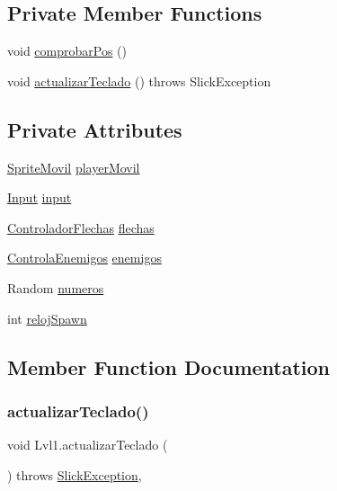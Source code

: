 \subsection*{Private Member Functions}
\begin{DoxyCompactItemize}
\item 
void \mbox{\hyperlink{class_lvl1_a78b06f34feedd942b1af193cedb0ed1e}{comprobar\+Pos}} ()
\item 
void \mbox{\hyperlink{class_lvl1_aa60cbf1fa3189b5e57d8c0171c4d634c}{actualizar\+Teclado}} ()  throws Slick\+Exception
\end{DoxyCompactItemize}
\subsection*{Private Attributes}
\begin{DoxyCompactItemize}
\item 
\mbox{\hyperlink{class_sprite_movil}{Sprite\+Movil}} \mbox{\hyperlink{class_lvl1_a7ac9bfa1d79eb27089228a152072efd2}{player\+Movil}}
\item 
\mbox{\hyperlink{classorg_1_1newdawn_1_1slick_1_1_input}{Input}} \mbox{\hyperlink{class_lvl1_abd0692137420767ebe0bb0b3d5b2cfd8}{input}}
\item 
\mbox{\hyperlink{class_controlador_flechas}{Controlador\+Flechas}} \mbox{\hyperlink{class_lvl1_a252ada5a964b9a5b559aaa0773cb5643}{flechas}}
\item 
\mbox{\hyperlink{class_controla_enemigos}{Controla\+Enemigos}} \mbox{\hyperlink{class_lvl1_af3ba4e431a1c46ce7ee27eaf566c5978}{enemigos}}
\item 
Random \mbox{\hyperlink{class_lvl1_ad5839902bce539ea6f65fd915b1c5e8a}{numeros}}
\item 
int \mbox{\hyperlink{class_lvl1_a414b04482f33deead358ca7f1b5c6de0}{reloj\+Spawn}}
\end{DoxyCompactItemize}


\subsection{Member Function Documentation}
\mbox{\label{class_lvl1_aa60cbf1fa3189b5e57d8c0171c4d634c}} 
\subsubsection{\texorpdfstring{actualizar\+Teclado()}{actualizarTeclado()}}
{\footnotesize\ttfamily void Lvl1.\+actualizar\+Teclado (\begin{DoxyParamCaption}{ }\end{DoxyParamCaption}) throws \mbox{\hyperlink{classorg_1_1newdawn_1_1slick_1_1_slick_exception}{Slick\+Exception}}\hspace{0.3cm}{\ttfamily [inline]}, {\ttfamily [private]}}


